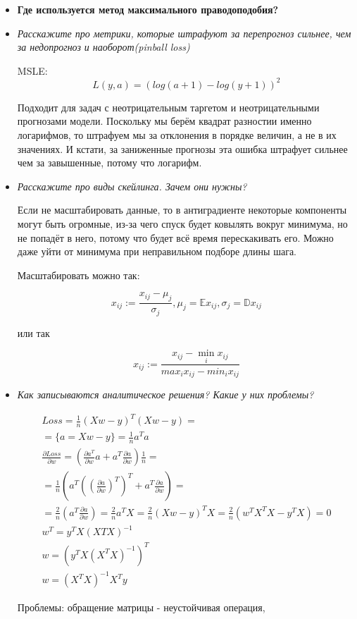 \documentclass[12pt]{article}
\begin{document}
\begin{itemize}
\item \textbf{Где используется метод максимального праводоподобия?}

\item \textit{Расскажите про метрики, которые штрафуют за перепрогноз сильнее, чем за
недопрогноз и наоборот(pinball loss)}

MSLE:
\[ L(y, a) = (log(a+1) - log(y+1))^2 \]

Подходит для задач с неотрицательным таргетом и неотрицательными прогнозами модели. Поскольку мы берём квадрат разностии именно логарифмов, то штрафуем мы за отклонения в порядке величин, а не в их значениях. И кстати, за заниженные прогнозы эта ошибка штрафует сильнее чем за завышенные, потому что логарифм.

\item \textit{Расскажите про виды скейлинга. Зачем они нужны?}

Если не масштабировать данные, то в антиградиенте некоторые компоненты могут быть огромные, из-за чего спуск будет ковылять вокруг минимума, но не попадёт в него, потому что будет всё время перескакивать его. Можно даже уйти от минимума при неправильном подборе длины шага.

Масштабировать можно так:

\[ x_{ij} := \frac{x_{ij} - \mu_j}{\sigma_j}, \mu_j = \mathbb{E} x_{ij}, \sigma_j = \mathbb{D} x_{ij} \]

или так 

\[ x_{ij} := \frac{x_{ij} - \min_i x_{ij}}{max_i x_{ij} - min_i x_{ij}} \]

\item \textit{Как записываются аналитическое решения? Какие у них проблемы?}

\begin{equation}
\begin{gathered}
Loss = \frac{1}{n} (Xw -y)^T (Xw - y) = \\
= \{ a = Xw - y \} = \frac{1}{n} a^T a \\
\frac{\partial Loss}{\partial w} = \left( \frac{\partial a^T}{\partial w} a + a^T \frac{\partial a}{\partial w} \right) \frac{1}{n} = \\
= \frac{1}{n} \left( a^T \left( \left( \frac{\partial a}{\partial w} \right)^T \right)^T + a^T \frac{\partial a}{\partial w} \right) =  \\
= \frac{2}{n} \left( a^T \frac{\partial a}{\partial w} \right) = \frac{2}{n} a^T X = \frac{2}{n} \left( Xw-y \right)^T X = \frac{2}{n} \left( w^TX^TX-y^TX \right) = 0\\
w^T = y^TX (XTX)^{-1} \\
w = \left( y^TX (X^TX)^{-1} \right)^T\\
w = (X^TX)^{-1}X^Ty
\end{gathered}
\end{equation}

Проблемы: обращение матрицы - неустойчивая операция,

\end{itemize}
\end{document}
